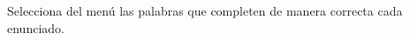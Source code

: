 Selecciona del menú las palabras que completen de manera correcta cada enunciado.
\begin{parts}
    
    
    
    
\end{parts}